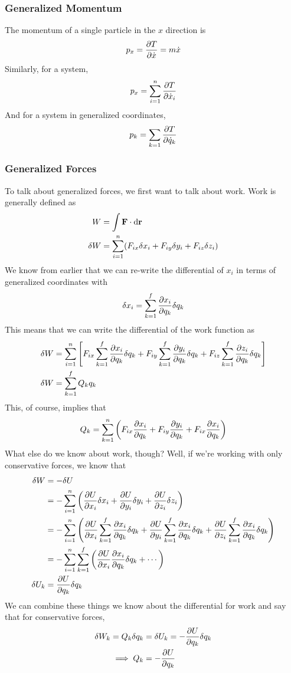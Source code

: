\documentclass[a4paper]{article}
\begin{document}
\subsubsection{Generalized Momentum}
The momentum of a single particle in the $x$ direction is
\[
	p_x = \frac{\partial T}{\partial \dot{x}}=m\dot{x}
\]
Similarly, for a system,
\[
	p_x = \sum_{i=1}^{n}\frac{\partial T}{\partial \dot{x}_i}
\]
And for a system in generalized coordinates,
\[
	p_k = \sum_{k=1}\frac{\partial T}{\partial \dot{q}_k}
\]

\subsubsection{Generalized Forces}
To talk about generalized forces, we first want to talk about work. Work is
generally defined as
\begin{align*}
	W &= \int\boldsymbol{\mathbf{F}}\cdot\mathrm{d}\boldsymbol{\mathbf{r}}\\
	\delta W &= \sum_{i=1}^n(F_{ix}\delta x_i + F_{iy}\delta y_i
		+ F_{iz}\delta z_i)
\end{align*}
We know from earlier that we can re-write the differential of $x_i$ in
terms of generalized coordinates with
\[ \delta x_i = \sum^f_{k=1}\frac{\partial x_i}{\partial q_k}\delta q_k \]
This means that we can write the differential of the work function as
\begin{align*}
	\delta W &= \sum^n_{i=1}\left[
		F_{ix}\sum^f_{k=1}\frac{\partial x_i}{\partial q_k}\delta q_k+
		F_{iy}\sum^f_{k=1}\frac{\partial y_i}{\partial q_k}\delta q_k+
		F_{iz}\sum^f_{k=1}\frac{\partial z_i}{\partial q_k}\delta q_k\right]\\
	\delta W &= \sum^f_{k=1}Q_kq_k
\end{align*}
This, of course, implies that
\[
	Q_k = \sum^n_{k=1}\left(F_{ix}\frac{\partial x_i}{\partial q_k} + F_{iy}\frac{\partial y_i}{\partial q_k}
	+F_{ix}\frac{\partial x_i}{\partial q_k}\right)
\]
What else do we know about work, though? Well, if we're working with only
conservative forces, we know that
\begin{align*}
	\delta W &= -\delta U\\
		 &= -\sum_{i=1}^n\left(\frac{\partial U}{\partial x_i}\delta x_i
			+\frac{\partial U}{\partial y_i}\delta y_i
			+\frac{\partial U}{\partial z_i}\delta z_i\right)\\
			&= -\sum_{i=1}^n\left(
			\frac{\partial U}{\partial x_i}\sum_{k=1}^f\frac{\partial x_i}{\partial q_k}\delta q_k
			+\frac{\partial U}{\partial y_i}\sum_{k=1}^f\frac{\partial x_i}{\partial q_k}\delta q_k
			+\frac{\partial U}{\partial z_i}\sum_{k=1}^f\frac{\partial x_i}{\partial q_k}\delta q_k
			\right)\\
		 &= -\sum_{i=1}^n\sum_{k=1}^f\left(
			\frac{\partial U}{\partial x_i}\frac{\partial x_i}{\partial q_k}\delta q_k+\cdots\right)\\
	\delta U_k &= \frac{\partial U}{\partial q_k}\delta q_k
\end{align*}
We can combine these things we know about the differential for work and say
that for conservative forces,
\begin{align*}
	\delta W_k = Q_k\delta q_k  &= \delta U_k = -\frac{\partial U}{\partial q_k}\delta q_k\\
	\implies Q_k &= -\frac{\partial U}{\partial q_k}
\end{align*}
\end{document}
